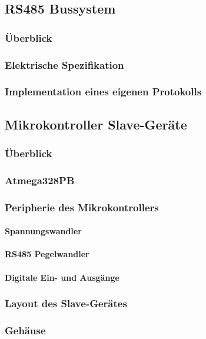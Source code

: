\subsection{RS485 Bussystem}
\subsubsection{Überblick}
\subsubsection{Elektrische Spezifikation}
\subsubsection{Implementation eines eigenen Protokolls}

\subsection{Mikrokontroller Slave-Geräte}
\subsubsection{Überblick}
\subsubsection{Atmega328PB}
\subsubsection{Peripherie des Mikrokontrollers}
\paragraph{Spannungswandler}
\paragraph{RS485 Pegelwandler}
\paragraph{Digitale Ein- und Ausgänge}
\subsubsection{Layout des Slave-Gerätes}
\subsubsection{Gehäuse}


